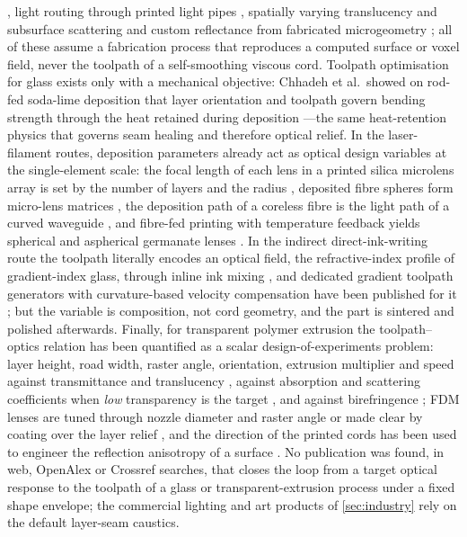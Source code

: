 \citep{zhao2016lampshades}, light routing through printed light pipes \citep{willis2012printedoptics,pereira2014routing}, spatially varying translucency and subsurface scattering \citep{dong2010sss,papas2013translucent,elek2017scattering,brunton2018translucency,nagasawa2023translucency} and custom reflectance from fabricated microgeometry \citep{weyrich2009microgeometry}; all of these assume a fabrication process that reproduces a computed surface or voxel field, never the toolpath of a self-smoothing viscous cord. Toolpath optimisation for glass exists only with a mechanical objective: Chhadeh et al.\ showed on rod-fed soda-lime deposition that layer orientation and toolpath govern bending strength through the heat retained during deposition \citep{chhadeh2026toolpath}---the same heat-retention physics that governs seam healing and therefore optical relief. In the laser-filament routes, deposition parameters already act as optical design variables at the single-element scale: the focal length of each lens in a printed silica microlens array is set by the number of layers and the radius \citep{kth2024microlens}, deposited fibre spheres form micro-lens matrices \citep{rettschlag2020microlens}, the deposition path of a coreless fibre is the light path of a curved waveguide \citep{kranert2020waveguide}, and fibre-fed printing with temperature feedback yields spherical and aspherical germanate lenses \citep{hong2023germanate}. In the indirect direct-ink-writing route the toolpath literally encodes an optical field, the refractive-index profile of gradient-index glass, through inline ink mixing \citep{destino2018,dyllaspears2020grin}, and dedicated gradient toolpath generators with curvature-based velocity compensation have been published for it \citep{sage2026fermat}; but the variable is composition, not cord geometry, and the part is sintered and polished afterwards. Finally, for transparent polymer extrusion the toolpath--optics relation has been quantified as a scalar design-of-experiments problem: layer height, road width, raster angle, orientation, extrusion multiplier and speed against transmittance and translucency \citep{kumar2022transparency,kumar2024transparency,vochozka2024translucency,hamp2021transmittance,quero2021microfluidic}, against absorption and scattering coefficients when \emph{low} transparency is the target \citep{amendola2021diffuse}, and against birefringence \citep{ren2023anisotropy}; FDM lenses are tuned through nozzle diameter and raster angle \citep{blachowicz2021optical,heinrich2016optics,gao2023review} or made clear by coating over the layer relief \citep{rooney2024lenses}, and the direction of the printed cords has been used to engineer the reflection anisotropy of a surface \citep{anisotag2023}. No publication was found, in web, OpenAlex or Crossref searches, that closes the loop from a target optical response to the toolpath of a glass or transparent-extrusion process under a fixed shape envelope; the commercial lighting and art products of \cref{sec:industry} rely on the default layer-seam caustics.

